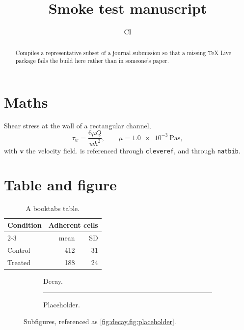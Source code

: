 \documentclass[11pt]{article}
\title{Smoke test manuscript}
\author[1]{CI \orcidlink{0000-0002-1825-0097}}
\affil[1]{Continuous Integration, Nowhere}
\begin{document}
\maketitle

\begin{abstract}
Compiles a representative subset of a journal submission so that a missing
TeX Live package fails the build here rather than in someone's paper.
\end{abstract}

\section{Maths}
\label{sec:maths}

Shear stress at the wall of a rectangular channel,
\begin{equation}
  \tau_w = \frac{6 \mu Q}{w h^{2}}, \qquad \mu = \SI{1.0e-3}{\pascal\second},
  \label{eq:shear}
\end{equation}
with $\bm{v}$ the velocity field.  is referenced through
\texttt{cleveref}, and \citet{knuth1984} through \texttt{natbib}.

\section{Table and figure}

\begin{table}[H]
  \centering
  \caption{A booktabs table.}
  \label{tab:demo}
  \begin{tabular}{lrr}
    \toprule
    Condition & \multicolumn{2}{c}{Adherent cells} \\
    \cmidrule(lr){2-3}
              & mean & SD \\
    \midrule
    Control   & 412  & 31 \\
    Treated   & 188  & 24 \\
    \bottomrule
  \end{tabular}
\end{table}

\begin{figure}[H]
  \centering
  \begin{subfigure}{0.45\textwidth}
    \centering
    \caption{Decay.}
    \label{fig:decay}
  \end{subfigure}
  \hfill
  \begin{subfigure}{0.45\textwidth}
    \centering
    \rule{3cm}{2cm}
    \caption{Placeholder.}
    \label{fig:placeholder}
  \end{subfigure}
  \caption{Subfigures, referenced as \cref{fig:decay,fig:placeholder}.}
\end{figure}
\end{document}

